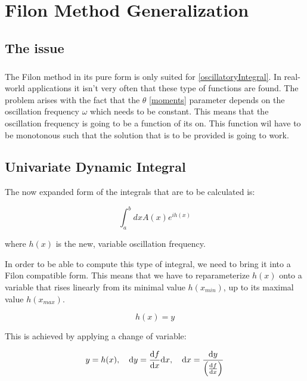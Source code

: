 \chapter{Filon Method Generalization}

\section{The issue}

\paragraph{} The Filon method in its pure form is only suited for \eqref{oscillatoryIntegral}.
In real-world applications it isn't very often that these type of functions are found. The problem arises with the fact that the $\theta$ \eqref{moments} parameter depends on the oscillation frequency $\omega$ which needs to be constant.
This means that the oscillation frequency is going to be a function of its on. This function wil have to be monotonous such that the solution that is to be provided is going to work. 

\section{Univariate Dynamic Integral}

The now expanded form of the integrals that are to be calculated is:

\begin{equation}
    \int_{a}^{b}dxA(x)e^{ih(x)}
\end{equation}

where $h(x)$ is the new, variable oscillation frequency.

In order to be able to compute this type of integral, we need to bring it into a Filon compatible form. This means that we have to reparameterize $h(x)$ onto a variable that rises linearly from its minimal value $h(x_{min})$, up to its maximal value $h(x_{max})$.

\begin{equation}
    h(x)=y \label{parameterization}   
\end{equation}

This is achieved by applying a change of variable:

\begin{equation}
    y=h(x), \quad \dd y=\dv{f}{x} \dd x, \quad \dd x=\frac{\dd y}{\left(\dv{f}{x}\right)} \label{changeOfVariable}
\end{equation}


